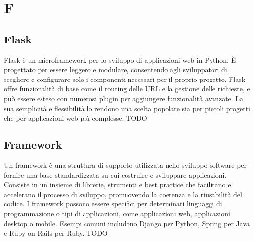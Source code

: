\section{F}

\vspace{2em}
\subsection*{Flask}
Flask è un microframework per lo sviluppo di applicazioni web in Python. È progettato per essere leggero e modulare, consentendo agli sviluppatori di scegliere e configurare solo i componenti necessari per il proprio progetto. Flask offre funzionalità di base come il routing delle URL e la gestione delle richieste, e può essere esteso con numerosi plugin per aggiungere funzionalità avanzate. La sua semplicità e flessibilità lo rendono una scelta popolare sia per piccoli progetti che per applicazioni web più complesse.
TODO

\vspace{2em}
\subsection*{Framework}
Un framework è una struttura di supporto utilizzata nello sviluppo software per fornire una base standardizzata su cui costruire e sviluppare applicazioni. Consiste in un insieme di librerie, strumenti e best practice che facilitano e accelerano il processo di sviluppo, promuovendo la coerenza e la riusabilità del codice. I framework possono essere specifici per determinati linguaggi di programmazione o tipi di applicazioni, come applicazioni web, applicazioni desktop o mobile. Esempi comuni includono Django per Python, Spring per Java e Ruby on Rails per Ruby.
TODO